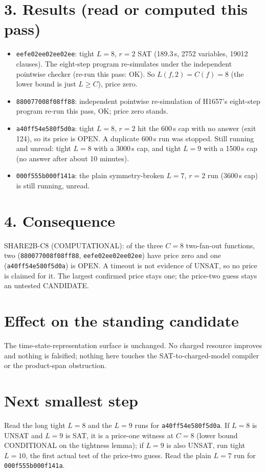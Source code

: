 \documentclass[11pt]{article}
\begin{document}
\section*{3. Results (read or computed this pass)}
\begin{itemize}
\item \texttt{eefe02ee02ee02ee}: tight $L=8$, $r=2$ SAT (189.3\,s, 2752 variables, 19012 clauses). The eight-step program re-simulates under the independent pointwise checker (re-run this pass: OK). So $L(f,2)=C(f)=8$ (the lower bound is just $L\ge C$), price zero.
\item \texttt{880077008f08ff88}: independent pointwise re-simulation of H1657's eight-step program re-run this pass, OK; price zero stands.
\item \texttt{a40ff54e580f5d0a}: tight $L=8$, $r=2$ hit the 600\,s cap with no answer (exit 124), so its price is OPEN. A duplicate 600\,s run was stopped. Still running and unread: tight $L=8$ with a 3000\,s cap, and tight $L=9$ with a 1500\,s cap (no answer after about 10 minutes).
\item \texttt{000f555b000f141a}: the plain symmetry-broken $L=7$, $r=2$ run (3600\,s cap) is still running, unread.
\end{itemize}

\section*{4. Consequence}
SHARE2B-C8 (COMPUTATIONAL): of the three $C=8$ two-fan-out functions, two (\texttt{880077008f08ff88}, \texttt{eefe02ee02ee02ee}) have price zero and one (\texttt{a40ff54e580f5d0a}) is OPEN. A timeout is not evidence of UNSAT, so no price is claimed for it. The largest confirmed price stays one; the price-two guess stays an untested CANDIDATE.

\section*{Effect on the standing candidate}
The time-state-representation surface is unchanged. No charged resource improves and nothing is falsified; nothing here touches the SAT-to-charged-model compiler or the product-span obstruction.

\section*{Next smallest step}
Read the long tight $L=8$ and the $L=9$ runs for \texttt{a40ff54e580f5d0a}. If $L=8$ is UNSAT and $L=9$ is SAT, it is a price-one witness at $C=8$ (lower bound CONDITIONAL on the tightness lemma); if $L=9$ is also UNSAT, run tight $L=10$, the first actual test of the price-two guess. Read the plain $L=7$ run for \texttt{000f555b000f141a}.
\end{document}
